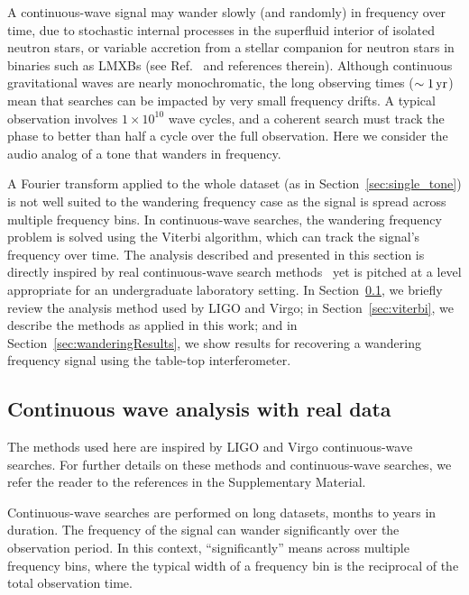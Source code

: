 \documentclass[paper-main.tex]{subfiles}
\begin{document}
A continuous-wave signal may wander slowly (and randomly) in frequency over time, due to stochastic internal processes in the superfluid interior of isolated neutron stars, or variable accretion from a stellar companion for neutron stars in binaries such as LMXBs (see Ref.~\cite{SuvorovaEtAl:2017} and references therein).
Although continuous gravitational waves are nearly monochromatic, the long observing times ($\sim 1\,{\rm yr}$) mean that searches can be impacted by very small frequency drifts. 
A typical observation involves $1 \times 10^{10}$ wave cycles, and a coherent search must track the phase to better than half a cycle over the full observation. 
Here we consider the audio analog of a tone that wanders in frequency. 



A Fourier transform applied to the whole dataset (as in Section~\ref{sec:single_tone}) is not well suited to the wandering frequency case as the signal is spread across multiple frequency bins. 
In continuous-wave searches, the wandering frequency problem is solved using the Viterbi algorithm,\cite{Viterbi:1967} which can track the signal's frequency over time.
The analysis described and presented in this section is directly inspired by real continuous-wave search methods~\cite{SuvorovaEtAl:2017} yet is pitched at a level appropriate for an undergraduate laboratory setting. 
In Section~\ref{sec:realCWSearches}, we briefly review the analysis method used by LIGO and Virgo; in Section~\ref{sec:viterbi}, we describe the methods as applied in this work; and in Section~\ref{sec:wanderingResults}, we show results for recovering a wandering frequency signal using the table-top interferometer. 


\subsection{Continuous wave analysis with real data}
\label{sec:realCWSearches}


The methods used here are inspired by LIGO and Virgo continuous-wave searches. 
For further details on these methods and continuous-wave searches, we refer the reader to the references in the Supplementary Material. 


Continuous-wave searches are performed on long datasets, months to years in duration. 
The frequency of the signal can wander significantly over the observation period. 
In this context, ``significantly'' means across multiple frequency bins, where the typical width of a frequency bin is the reciprocal of the total observation time.\cite{JKS:1998,ScoX1O2Viterbi:2019}
\end{document}
